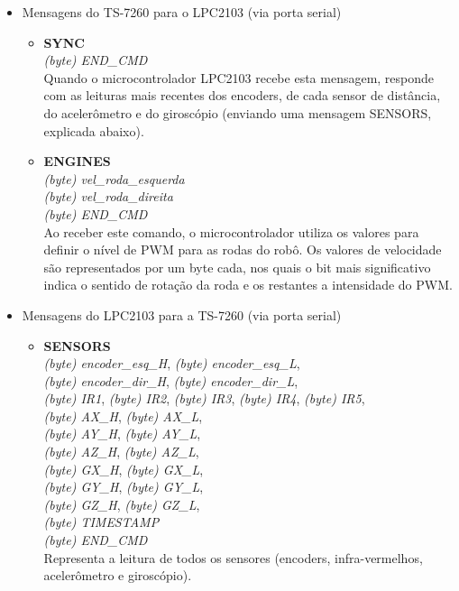 \begin{itemize}
  \item Mensagens do TS-7260 para o LPC2103 (via porta serial)
  
	\begin{itemize}
		
	  \item \textbf{SYNC}\\
	  \textit{(byte) END\_CMD}\\
	  Quando o microcontrolador LPC2103 recebe esta mensagem, responde com as leituras mais recentes dos encoders, de cada sensor de distância, do acelerômetro e do giroscópio (enviando uma mensagem SENSORS, explicada abaixo).
	  
	  \item \textbf{ENGINES}\\
	  \textit{(byte) vel\_roda\_esquerda}\\
	  \textit{(byte) vel\_roda\_direita}\\
	  \textit{(byte) END\_CMD}\\
	  Ao receber este comando, o microcontrolador utiliza os valores para definir o nível de PWM para as rodas do robô. Os valores de velocidade são representados por um byte cada, nos quais o bit mais significativo indica o sentido de rotação da roda e os restantes a intensidade do PWM.
	  
	  \end{itemize}
	  
	  \item Mensagens do LPC2103 para a TS-7260 (via porta serial)
	  
	  \begin{itemize}
	  
	  \item \textbf{SENSORS}\\
	  \textit{(byte) encoder\_esq\_H}, \textit{(byte) encoder\_esq\_L},\\
	  \textit{(byte) encoder\_dir\_H}, \textit{(byte) encoder\_dir\_L},\\
	  \textit{(byte) IR1}, \textit{(byte) IR2}, \textit{(byte) IR3}, \textit{(byte) IR4}, \textit{(byte) IR5},\\
	  \textit{(byte) AX\_H}, \textit{(byte) AX\_L},\\
	  \textit{(byte) AY\_H}, \textit{(byte) AY\_L},\\
	  \textit{(byte) AZ\_H}, \textit{(byte) AZ\_L},\\
	  \textit{(byte) GX\_H}, \textit{(byte) GX\_L},\\
	  \textit{(byte) GY\_H}, \textit{(byte) GY\_L},\\
	  \textit{(byte) GZ\_H}, \textit{(byte) GZ\_L},\\
	  \textit{(byte) TIMESTAMP}\\
	  \textit{(byte) END\_CMD}\\
	  Representa a leitura de todos os sensores (encoders, infra-vermelhos, acelerômetro e giroscópio). 
	  

\end{itemize}
\end{itemize}
